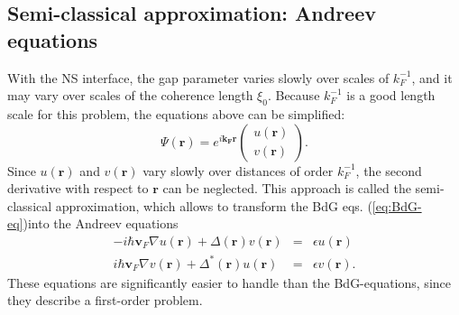 \subsection*{Semi-classical approximation: Andreev equations}

With the NS interface, the gap parameter varies slowly over scales of $k_F^{-1}$, and it may vary over scales of the coherence length $\xi_0$. Because $k_F^{-1}$ is a good length scale for this problem, the equations above can be simplified:
\begin{equation}
\Psi \left( \mathbf{r} \right) = e^{i \mathbf{k_F} \mathbf{r} } \begin{pmatrix} u \left( \mathbf{r} \right) \\ v \left( \mathbf{r} \right)\end{pmatrix}.
\end{equation}
Since $u  \left( \mathbf{r} \right) $ and $v  \left( \mathbf{r} \right) $ vary slowly over distances of order $k_F^{-1}$, the second derivative with respect to $\mathbf{r}$ can be neglected. This approach is called the semi-classical approximation, which allows to transform the BdG eqs. (\ref{eq:BdG-eq})into the Andreev equations
\begin{eqnarray}
- i \hbar \mathbf{v}_F \nabla u \left( \mathbf{r} \right)  + \Delta \left( \mathbf{r} \right)  v  \left( \mathbf{r} \right)  &=& \epsilon u  \left( \mathbf{r} \right)  \\
 i \hbar \mathbf{v}_F \nabla v  \left( \mathbf{r} \right)  + \Delta^* \left( \mathbf{r} \right)  u  \left( \mathbf{r} \right)  &=& \epsilon v  \left( \mathbf{r} \right) .
\end{eqnarray}
These equations are significantly easier to handle than the BdG-equations, since they describe a first-order problem.

